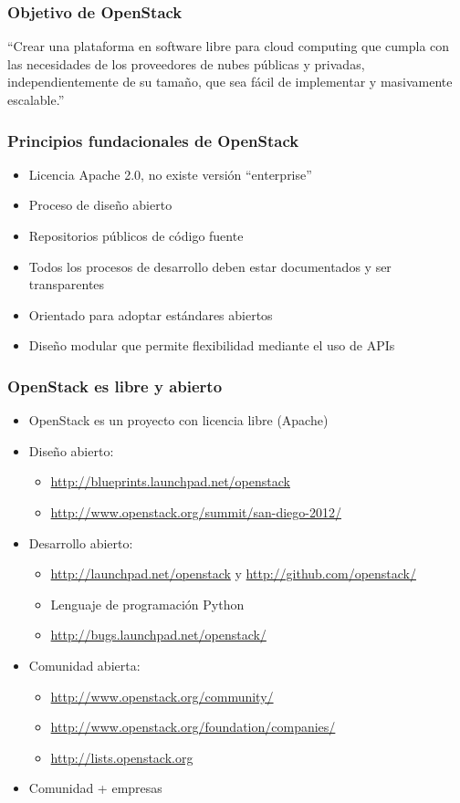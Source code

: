 \documentclass{beamer}
\begin{document}
\begin{frame}
  \frametitle{Objetivo de OpenStack}
  \begin{center}
    ``Crear una plataforma en software libre para cloud computing que cumpla con
    las necesidades de los proveedores de nubes públicas y privadas,
    independientemente de su tamaño, que sea fácil de implementar y masivamente
    escalable.''
  \end{center}
\end{frame}

\begin{frame}
  \frametitle{Principios fundacionales de OpenStack}
  \begin{itemize}
  \item Licencia Apache 2.0, no existe versión ``enterprise''
  \item Proceso de diseño abierto
  \item Repositorios públicos de código fuente
  \item Todos los procesos de desarrollo deben estar documentados y ser
    transparentes
  \item Orientado para adoptar estándares abiertos
  \item Diseño modular que permite flexibilidad mediante el uso de APIs
  \end{itemize}
\end{frame}
\begin{frame}[fragile]
  \frametitle{OpenStack es libre y abierto}
  \begin{itemize}
  \item OpenStack es un proyecto con licencia libre (Apache)
  \item Diseño abierto:
    \begin{itemize}
    \item \url{http://blueprints.launchpad.net/openstack}
    \item \url{http://www.openstack.org/summit/san-diego-2012/}
    \end{itemize}
  \item Desarrollo abierto:
    \begin{itemize}
    \item \url{http://launchpad.net/openstack} y \url{http://github.com/openstack/}
    \item Lenguaje de programación Python
    \item \url{http://bugs.launchpad.net/openstack/}
    \end{itemize}
    \item Comunidad abierta:
      \begin{itemize}
      \item \url{http://www.openstack.org/community/}
      \item \url{http://www.openstack.org/foundation/companies/}
      \item \url{http://lists.openstack.org}
      \end{itemize}
    \item Comunidad + empresas
  \end{itemize}
\end{frame}
\end{document}
